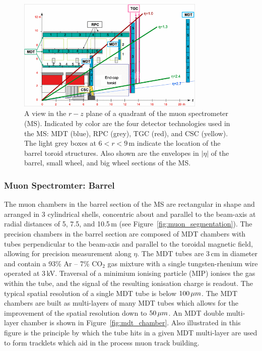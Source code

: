 \begin{figure}[!htb]
    \begin{center}
        \includegraphics[width=0.8\textwidth]{figures/chapter2/muon_spec/atlas_muon_plan_view_eta}
        \caption{
            A view in the $r-z$ plane of a quadrant of the muon spectrometer (MS).
            Indicated by color are the four detector technologies used in the MS:
            MDT (blue), RPC (grey), TGC (red), and CSC (yellow).
            The light grey boxes at $6 < r < 9$\,m indicate the location of the
            barrel toroid structures.
            Also shown are the envelopes in $\lvert \eta \rvert$ of the barrel,
            small wheel, and big wheel sections of the MS.
        }
        \label{fig:muon_plan_view_eta}
    \end{center}
\end{figure}
\FloatBarrier

\subsubsection{Muon Spectromter: Barrel}
\label{sec:ms_barrel}

The muon chambers in the barrel section of the MS are rectangular in shape and arranged in 3 cylindrical shells,
concentric about and parallel to the beam-axis at radial distances of 5, 7.5, and 10.5\,m (see Figure~\ref{fig:muon_segmentation}).
The precision chambers in the barrel section are composed of MDT chambers
with tubes perpendicular to the beam-axis and parallel to the toroidal magnetic field,
allowing for precision measurement along $\eta$.
The MDT tubes are $3\,$cm in diameter and contain a 93\% Ar -- 7\% CO$_2$ gas mixture
with a single tungsten-rhenium wire operated at $3$\,kV.
Traversal of a minimium ionising particle (MIP) ionises the gas within the tube,
and the signal of the resulting ionisation charge is readout.
The typical spatial resolution of a single MDT tube is below $100\,\mu m$.
The MDT chambers are built as multi-layers of many MDT tubes which allows for the improvement
of the spatial resolution down to $50\,\mu m$.
An MDT double multi-layer chamber is shown in Figure~\ref{fig:mdt_chamber}.
Also illustrated in this figure is the principle by which the tube hits in a given MDT
multi-layer are used to form tracklets which aid in the process muon track building.

